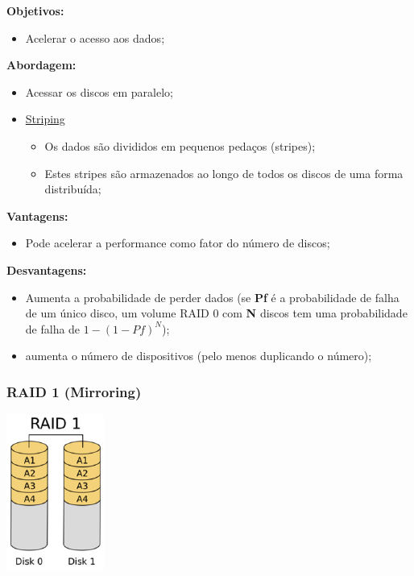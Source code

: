 \documentclass{article}
\begin{document}
\begin{flushleft}
  \textbf{Objetivos:}
  \begin{itemize}
    \item Acelerar o acesso aos dados;
  \end{itemize}

  \textbf{Abordagem:}
  \begin{itemize}
    \item Acessar os discos em paralelo;
    \item \uline{Striping}
    \begin{itemize}
      \item Os dados são divididos em pequenos pedaços (stripes);
      \item Estes stripes são armazenados ao longo de todos os discos de uma forma distribuída;
    \end{itemize}
  \end{itemize}

  \pagebreak

  \textbf{Vantagens:}
  \begin{itemize}
    \item Pode acelerar a performance como fator do número de discos;
  \end{itemize}

  \textbf{Desvantagens:}
  \begin{itemize}
    \item Aumenta a probabilidade de perder dados
    (se \textbf{Pf} é a probabilidade de falha de um único disco,
    um volume RAID 0 com \textbf{N} discos tem uma probabilidade
    de falha de $1-(1-Pf)^N$);
    \item aumenta o número de dispositivos (pelo menos duplicando o número);
  \end{itemize}
\end{flushleft}

\subsubsection{RAID 1 (Mirroring)}

\begin{center}
  \includegraphics[scale=0.6]{33}
\end{center}
\end{document}
